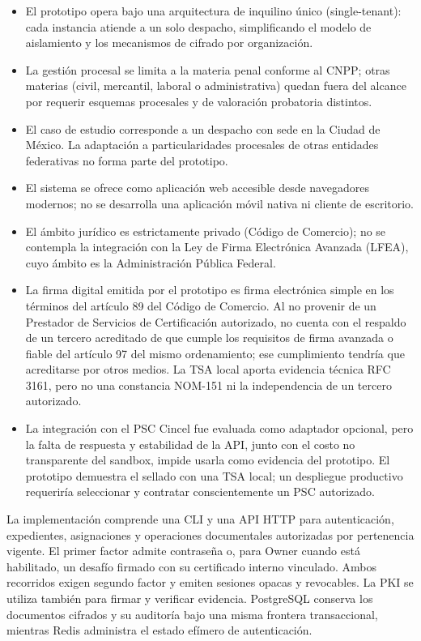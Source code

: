 \begin{itemize}
  \item El prototipo opera bajo una arquitectura de inquilino único (single-tenant): cada instancia atiende a un solo despacho, simplificando el modelo de aislamiento y los mecanismos de cifrado por organización.

  \item La gestión procesal se limita a la materia penal conforme al CNPP; otras materias (civil, mercantil, laboral o administrativa) quedan fuera del alcance por requerir esquemas procesales y de valoración probatoria distintos.

  \item El caso de estudio corresponde a un despacho con sede en la Ciudad de México. La adaptación a particularidades procesales de otras entidades federativas no forma parte del prototipo.

  \item El sistema se ofrece como aplicación web accesible desde navegadores modernos; no se desarrolla una aplicación móvil nativa ni cliente de escritorio.

  \item El ámbito jurídico es estrictamente privado (Código de Comercio); no se contempla la integración con la Ley de Firma Electrónica Avanzada (LFEA), cuyo ámbito es la Administración Pública Federal.

  \item La firma digital emitida por el prototipo es firma electrónica simple en los términos del artículo 89 del Código de Comercio. Al no provenir de un Prestador de Servicios de Certificación autorizado, no cuenta con el respaldo de un tercero acreditado de que cumple los requisitos de firma avanzada o fiable del artículo 97 del mismo ordenamiento; ese cumplimiento tendría que acreditarse por otros medios. La TSA local aporta evidencia técnica RFC 3161, pero no una constancia NOM-151 ni la independencia de un tercero autorizado.

  \item La integración con el PSC Cincel fue evaluada como adaptador opcional, pero la falta de respuesta y estabilidad de la API, junto con el costo no transparente del sandbox, impide usarla como evidencia del prototipo. El prototipo demuestra el sellado con una TSA local; un despliegue productivo requeriría seleccionar y contratar conscientemente un PSC autorizado.
\end{itemize}

La implementación comprende una CLI y una API HTTP para autenticación,
expedientes, asignaciones y operaciones documentales autorizadas por
pertenencia vigente. El primer factor admite contraseña o, para Owner cuando
está habilitado, un desafío firmado con su certificado interno vinculado.
Ambos recorridos exigen segundo factor y emiten sesiones opacas y revocables.
La PKI se utiliza también para firmar y verificar evidencia. PostgreSQL conserva los
documentos cifrados y su auditoría bajo una misma frontera transaccional,
mientras Redis administra el estado efímero de autenticación.

